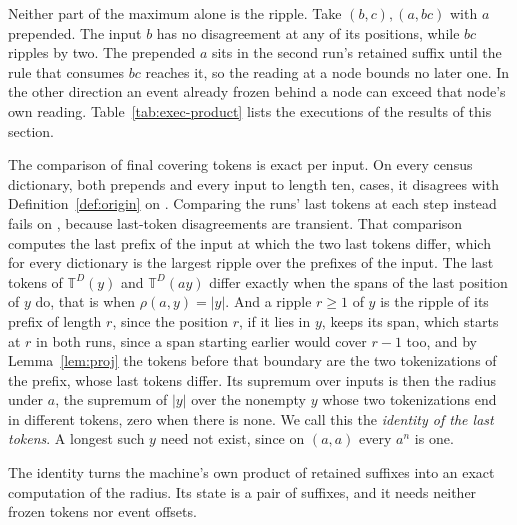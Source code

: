\documentclass[11pt,a4paper]{article}
\theoremstyle{definition}
\theoremstyle{plain}
\newcommand{\T}{\mathbb{T}}
\begin{document}

Neither part of the maximum alone is the ripple. Take \((b,c), (a,bc)\) with \(a\) prepended. The input \(b\) has no
disagreement at any of its positions, while \(bc\) ripples by two. The prepended \(a\) sits in the second run's retained
suffix until the rule that consumes \(bc\) reaches it, so the reading at a node bounds no later one. In the other
direction an event already frozen behind a node can exceed that node's own reading. Table~\ref{tab:exec-product} lists
the executions of the results of this section.

The comparison of final covering tokens is exact per input. On every census dictionary, both prepends and every input to
length ten, \MeasureCases{} cases, it disagrees with Definition~\ref{def:origin} on \FrozenMismatches{}. Comparing the
runs' last tokens at each step instead fails on \MeasureMismatches{}, because last-token disagreements are transient.
That comparison computes the last prefix of the input at which the two last tokens differ, which for every dictionary is
the largest ripple over the prefixes of the input. The last tokens of \(\T^D(y)\) and \(\T^D(ay)\) differ exactly when
the spans of the last position of \(y\) do, that is when \(\rho(a, y) = |y|\). And a ripple \(r \ge 1\) of \(y\) is the
ripple of its prefix of length \(r\), since the position \(r\), if it lies in \(y\), keeps its span, which starts at
\(r\) in both runs, since a span starting earlier would cover \(r - 1\) too, and by Lemma~\ref{lem:proj} the tokens
before that boundary are the two tokenizations of the prefix, whose last tokens differ. Its supremum over inputs is then
the radius under \(a\), the supremum of \(|y|\) over the nonempty \(y\) whose two tokenizations end in different tokens,
zero when there is none. We call this the \emph{identity of the last tokens}. A longest such \(y\) need not exist, since
on \((a, a)\) every \(a^n\) is one.

The identity turns the machine's own product of retained suffixes into an exact computation of the radius. Its state is
a pair of suffixes, and it needs neither frozen tokens nor event offsets.
\end{document}
